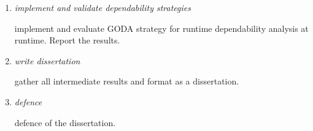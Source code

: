 \begin{enumerate}
\item \emph{implement and validate dependability strategies}

 implement and evaluate GODA\cite{mendonca_dependability_2015} strategy for runtime dependability analysis at runtime. Report the results.

\item \emph{write dissertation}

gather all intermediate results and format as a dissertation.

\item \emph{defence}

defence of the dissertation.

\end{enumerate}
